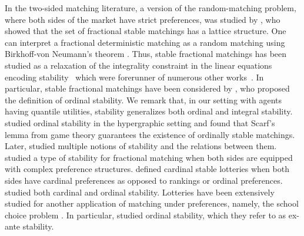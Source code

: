 In the two-sided matching literature, a version of the random-matching problem, where both sides of the market have strict preferences, was studied by \citet{RothRothblumVate1993lsm-lattice}, who showed that the set of fractional stable matchings has a lattice structure. One can interpret a fractional deterministic matching as a random matching using Birkhoff-von Neumann's theorem \citep[Theorem~3.2.6]{horn_topics_1991}.  
Thus, stable fractional matchings has been studied as a relaxation of the integrality constraint in the linear equations encoding stability~\citep{vandevate_linear_1989,abeledo_stable_1994,teo1998geometry} which were forerunner of numerous other works~\citep{BiroCechFleiner08stablehalfmatchings,KiPRST2013osmhypegraphic,KU2015,IK2018osm-hypergraphic,aziz_random_2019,CFKV20j,dogan_efficiency_2016,manjunath2013stability,manjunath2014markets}.
In particular, stable fractional matchings have been considered by \citet{AF03Scarfs}, who proposed the definition of ordinal stability. We remark that, in our setting with agents having quantile utilities, stability generalizes both ordinal and integral stability. \citet{AF03Scarfs} studied ordinal stability in the hypergraphic setting and found that Scarf’s lemma from game theory guarantees the existence of ordinally stable matchings.
Later, \citet{aziz_random_2019} studied multiple notions of stability and the relations between them.
\citet{alkan2003stable} studied a type of stability for fractional matching when both sides
are equipped with complex preference structures.
\citet{CFKV20j} defined cardinal stable lotteries when both sides have cardinal preferences as opposed to rankings or ordinal preferences. \citet{chen2020fractional} studied both cardinal and ordinal stability. 
Lotteries have been extensively studied for another application of matching under preferences, namely, the school choice problem \citep{abdulkadirouglu2003school,KU2015}. In particular, \citet{KU2015} studied ordinal stability, which they refer to as ex-ante stability.